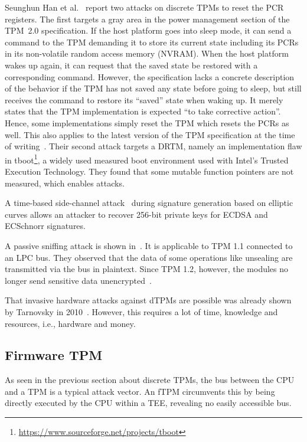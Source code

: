 Seunghun Han et al.~\cite{aBadDream} report two attacks on discrete TPMs to reset the PCR registers.
The first targets a gray area in the power management section of the TPM~2.0 specification.
If the host platform goes into sleep mode, it can send a command to the TPM demanding it to store its current state including its PCRs in its non-volatile random access memory (NVRAM).
When the host platform wakes up again, it can request that the saved state be restored with a corresponding command.
However, the specification lacks a concrete description of the behavior if the TPM has not saved any state before going to sleep, but still receives the command to restore its ``saved'' state when waking up.
It merely states that the TPM implementation is expected ``to take corrective action''.
Hence, some implementations simply reset the TPM which resets the \acp{PCR} as well.
This also applies to the latest version of the TPM specification at the time of writing~\cite{tpm20}.
Their second attack targets a \ac{DRTM}, namely an implementation flaw in tboot\footnote{\url{https://www.sourceforge.net/projects/tboot}}, a widely used measured boot environment used with Intel's Trusted Execution Technology.
They found that some mutable function pointers are not measured, which enables attacks.

A time-based side-channel attack~\cite{Moghimi2019} during signature generation based on elliptic curves allows an attacker to recover 256-bit private keys for ECDSA and ECSchnorr signatures.

A passive sniffing attack is shown in~\cite{Kursawe2005AnalyzingTP}.
It is applicable to TPM 1.1 connected to an LPC bus.
They observed that the data of some operations like unsealing are transmitted via the bus in plaintext.
Since TPM 1.2, however, the modules no longer send sensitive data unencrypted~\cite{Winter2013}.

That invasive hardware attacks against \acp{dTPM} are possible was already shown by Tarnovsky in 2010~\cite{tarnovsky}.
However, this requires a lot of time, knowledge and resources, i.e., hardware and money.

\subsection{Firmware TPM}

As seen in the previous section about discrete TPMs, the bus between the CPU and a TPM is a typical attack vector.
An \ac{fTPM} circumvents this by being directly executed by the CPU within a \ac{TEE}, revealing no easily accessible bus.

